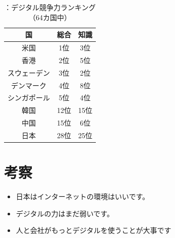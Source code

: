 \documentclass[a4paper,11pt,dvipdfmx]{ujarticle}
\begin{document}
\begin{table}[htbp]
    \centering
    \caption{：デジタル競争力ランキング（64カ国中）}\label{tbl:に}
    \begin{tabular}{|c|c|c|}\hline
        国 & 総合 & 知識 \\
        \hline
        米国 & 1位 & 3位\\
        \hline
        香港 & 2位 & 5位\\
        \hline
        スウェーデン & 3位 & 2位\\
        \hline
        デンマーク & 4位 & 8位\\
        \hline
        シンガポール & 5位 & 4位\\
        \hline
        \hline
        韓国 & 12位 & 15位\\
        \hline 
        中国 & 15位 & 6位\\
        \hline
        \hline
        日本 & 28位 & 25位 \\
        \hline
    \end{tabular}
\end{table}

\section{考察}
\begin{itemize}
    \item 日本はインターネットの環境はいいです。
    \item デジタルの力はまだ弱いです。
    \item 人と会社がもっとデジタルを使うことが大事です
\end{itemize}





\end{document}
